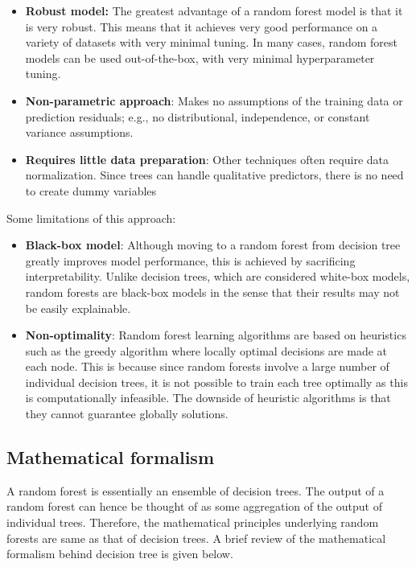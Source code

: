 \documentclass[conference]{IEEEtran}
\begin{document}
\begin{itemize}
    \item \textbf{Robust model:} The greatest advantage of a random forest model is that it is very robust. This means that it achieves very good performance on a variety of datasets with very minimal tuning. In many cases, random forest models can be used out-of-the-box, with very minimal hyperparameter tuning. 
    \item \textbf{Non-parametric approach}: Makes no assumptions of the training data or prediction residuals; e.g., no distributional, independence, or constant variance assumptions.
    \item \textbf{Requires little data preparation}: Other techniques often require data normalization. Since trees can handle qualitative predictors, there is no need to create dummy variables
\end{itemize}

Some limitations of this approach:
\begin{itemize}
    \item \textbf{Black-box model}: Although moving to a random forest from decision tree greatly improves model performance, this is achieved by sacrificing interpretability. Unlike decision trees, which are considered white-box models, random forests are black-box models in the sense that their results may not be easily explainable.  
    \item \textbf{Non-optimality}: Random forest learning algorithms are based on heuristics such as the greedy algorithm where locally optimal decisions are made at each node. This is because since random forests involve a large number of individual decision trees, it is not possible to train each tree optimally as this is computationally infeasible. The downside of heuristic algorithms is that they cannot guarantee globally solutions.
\end{itemize}





\subsection{Mathematical formalism}

A random forest is essentially an ensemble of decision trees. The output of a random forest can hence be thought of as some aggregation of the output of individual trees. Therefore, the mathematical principles underlying random forests are same as that of decision trees. A brief review of the mathematical formalism behind decision tree is given below.
\end{document}
